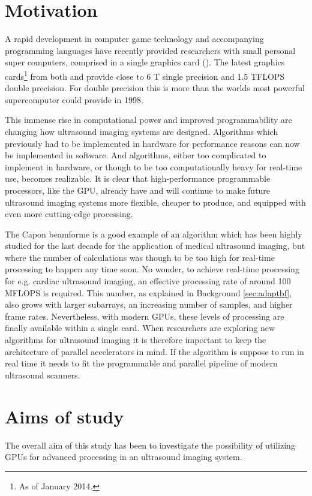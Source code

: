 \section{Motivation}
A rapid development in computer game technology and accompanying programming languages have recently provided researchers with small personal super computers, comprised in a single graphics card (). The latest graphics cards\footnote{As of January 2014.} from both  and  provide close to 6 T single precision and 1.5 TFLOPS double precision. For double precision this is more than the worlds most powerful supercomputer could provide in 1998.

This immense rise in computational power and improved programmability are changing how ultrasound imaging systems are designed. Algorithms which previously had to be implemented in hardware for performance reasons can now be implemented in software. And algorithms, either too complicated to implement in hardware, or though to be too computationally heavy for real-time use, becomes realizable. It is clear that high-performance programmable processors, like the GPU, already have and will continue to make future ultrasound imaging systems more flexible, cheaper to produce, and equipped with even more cutting-edge processing.

The Capon beamforme  is a good example of an algorithm which has been highly studied for the last decade for the application of medical ultrasound imaging, but where the number of calculations was though to be too high for real-time processing to happen any time soon. No wonder, to achieve real-time processing for e.g. cardiac ultrasound imaging, an effective processing rate of around 100 MFLOPS is required. This number, as explained in Background \ref{sec:adaptbf}, also grows with larger subarrays, an increasing number of samples, and higher frame rates.  Nevertheless, with modern GPUs, these levels of processing are finally available within a single card. When researchers are exploring new algorithms for ultrasound imaging it is therefore important to keep the architecture of parallel accelerators in mind. If the algorithm is suppose to run in real time it needs to fit the programmable and parallel pipeline of modern ultrasound scanners.

\section{Aims of study}
The overall aim of this study has been to investigate the possibility of utilizing GPUs for advanced processing in an ultrasound imaging system. 

